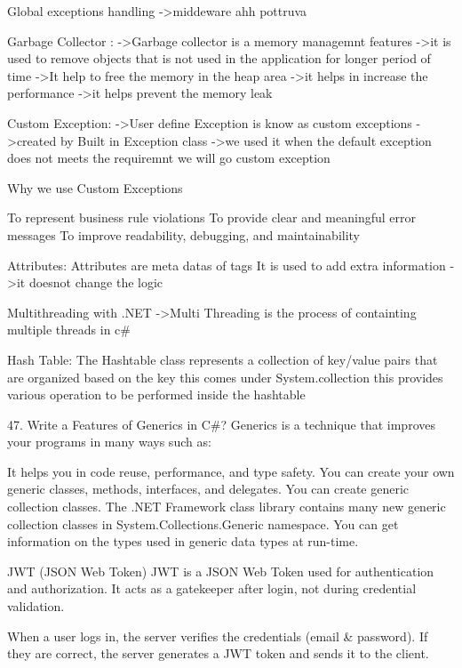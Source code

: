 Global exceptions handling ->middeware ahh pottruva

Garbage Collector :
                ->Garbage collector is a memory managemnt features
                ->it is used to remove objects that is not used in the application for longer period of time
                ->It help to free the memory in the heap area
                ->it helps in increase the performance
                ->it helps prevent the memory leak

Custom Exception:
                ->User define Exception is know as custom exceptions
                ->created by Built in Exception class
                ->we used it when the default exception does not meets the requiremnt we will go custom exception

         Why we use Custom Exceptions

                To represent business rule violations
                To provide clear and meaningful error messages
                To improve readability, debugging, and maintainability

Attributes:
        Attributes are meta datas of tags
        It is used to add extra information
        ->it doesnot change the logic

Multithreading with .NET
        ->Multi Threading is the process of containting multiple threads in c#


Hash Table:
        The Hashtable class represents a collection of key/value pairs that are organized based on the key
        this comes under System.collection 
        this provides various operation to be performed inside the hashtable

47. Write a Features of Generics in C#?
Generics is a technique that improves your programs in many ways such as:

It helps you in code reuse, performance, and type safety.
You can create your own generic classes, methods, interfaces, and delegates.
You can create generic collection classes. The .NET Framework class library contains many new generic collection classes in System.Collections.Generic namespace.
You can get information on the types used in generic data types at run-time.


JWT (JSON Web Token)
JWT is a JSON Web Token used for authentication and authorization.
It acts as a gatekeeper after login, not during credential validation.

When a user logs in, the server verifies the credentials (email & password).
If they are correct, the server generates a JWT token and sends it to the client.

